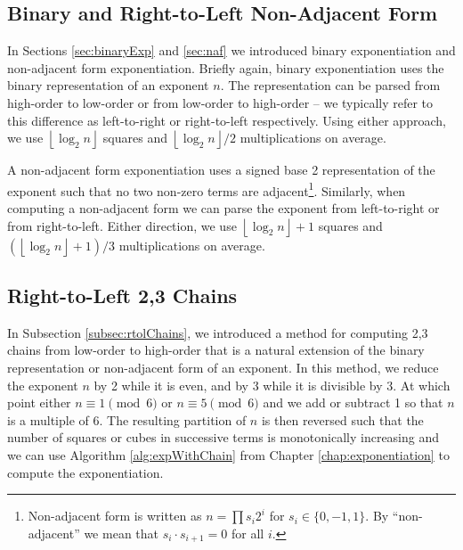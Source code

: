 \documentclass{ucalgthes1}
\theoremstyle{definition}
\newcommand{\floor}[1]{\left\lfloor #1 \right\rfloor}
\begin{document}
\subsection{Binary and Right-to-Left Non-Adjacent Form}

In Sections \ref{sec:binaryExp} and \ref{sec:naf} we introduced binary exponentiation and non-adjacent form exponentiation.  Briefly again, binary exponentiation uses the binary representation of an exponent $n$.  The representation can be parsed from high-order to low-order or from low-order to high-order -- we typically refer to this difference as left-to-right or right-to-left respectively.  Using either approach, we use $\floor{\log_2n}$ squares and $\floor{\log_2n}/2$ multiplications on average.

A non-adjacent form exponentiation uses a signed base 2 representation of the exponent such that no two non-zero terms are adjacent\footnote{Non-adjacent form is written as $n=\prod s_i2^i$ for $s_i \in \{0, -1, 1\}$. By ``non-adjacent'' we mean that $s_i \cdot s_{i+1} = 0$ for all $i$.}.  Similarly, when computing a non-adjacent form we can parse the exponent from left-to-right or from right-to-left.  Either direction, we use $\floor{\log_2n} + 1$ squares and $(\floor{\log_2n}+1)/3$ multiplications on average.   

\subsection{Right-to-Left 2,3 Chains}
In Subsection \ref{subsec:rtolChains}, we introduced a method for computing 2,3 chains from low-order to high-order that is a natural extension of the binary representation or non-adjacent form of an exponent.  In this method, we reduce the exponent $n$ by 2 while it is even, and by 3 while it is divisible by 3.  At which point either $n \equiv 1 \pmod 6$ or $n \equiv 5 \pmod 6$ and we add or subtract 1 so that $n$ is a multiple of 6.  The resulting partition of $n$ is then reversed such that the number of squares or cubes in successive terms is monotonically increasing and we can use Algorithm \ref{alg:expWithChain} from Chapter \ref{chap:exponentiation} to compute the exponentiation.
\end{document}
